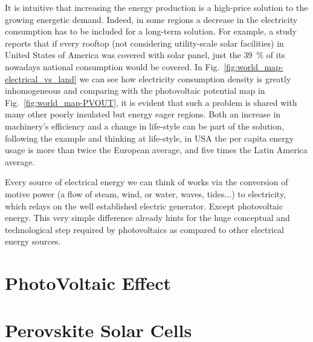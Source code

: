 	 It is intuitive that increasing the energy production is a high-price solution to the growing energetic demand.
	Indeed, in some regions a decrease in the electricity consumption has to be included for a long-term solution.
	For example, a study\cite{Margolis2016} reports that if every rooftop (not considering utility-scale solar facilities) in United States of America was covered with solar panel, just the 39~\% of its nowadays national consumption would be covered.
	In Fig.~\ref{fig:world_map-electrical_vs_land} we can see how electricity consumption density is greatly inhomogeneous and comparing with the photovoltaic potential map in Fig.~\ref{fig:world_map-PVOUT}, it is evident that such a problem is shared with many other poorly insulated but energy eager regions.
	Both an increase in machinery's efficiency and a change in life-style can be part of the solution, following the example and thinking at life-style, in USA the per capita energy usage is more than twice the European average, and five times the Latin America average.\cite{IEA}

	 Every source of electrical energy we can think of works via the conversion of motive power (a flow of steam, wind, or water, waves, tides...) to electricity, which relays on the well established electric generator. Except photovoltaic energy. This very simple difference already hints for the huge conceptual and technological step required by photovoltaics as compared to other electrical energy sources.
	

\section{PhotoVoltaic Effect}







\section{Perovskite Solar Cells}

